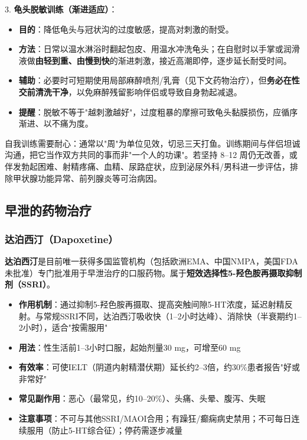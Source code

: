 3. \textbf{龟头脱敏训练（渐进适应）}：
  \begin{itemize}
  \item \textbf{目的}：降低龟头与冠状沟的过度敏感，提高对刺激的耐受。
  \item \textbf{方法}：日常以温水淋浴时翻起包皮、用温水冲洗龟头；在自慰时以手掌或润滑液做\textbf{由轻到重、由慢到快}的渐进刺激，接近高潮即停，逐步延长耐受时间。
  \item \textbf{辅助}：必要时可短期使用局部麻醉喷剂/乳膏（见下文药物治疗），但\textbf{务必在性交前清洗干净}，以免麻醉残留影响伴侣或导致自身勃起减退。
  \item \textbf{提醒}：脱敏不等于"越刺激越好"，过度粗暴的摩擦可致龟头黏膜损伤，应循序渐进、以不痛为度。
  \end{itemize}

\begin{tcolorbox}[colback=pink!5!white,colframe=red!50!black,title=贴心小叮咛]
自我训练需要耐心：通常以"周"为单位见效，切忌三天打鱼。训练期间与伴侣坦诚沟通，把它当作双方共同的事而非"一个人的功课"。若坚持 8--12 周仍无改善，或伴发勃起困难、射精疼痛、血精、尿路症状，应到泌尿外科/男科进一步评估，排除甲状腺功能异常、前列腺炎等可治病因。
\end{tcolorbox}

\subsection{早泄的药物治疗}

\subsubsection{达泊西汀（Dapoxetine）}

\textbf{达泊西汀}是目前唯一获得多国监管机构（包括欧洲EMA、中国NMPA，美国FDA未批准）专门批准用于早泄治疗的口服药物。属于\textbf{短效选择性5-羟色胺再摄取抑制剂（SSRI）}。

\begin{itemize}[leftmargin=2cm]
	\item \textbf{作用机制}：通过抑制5-羟色胺再摄取、提高突触间隙5-HT浓度，延迟射精反射。与常规SSRI不同，达泊西汀吸收快（1--2小时达峰）、消除快（半衰期约1--2小时），适合"按需服用"
	\item \textbf{用法}：性生活前1--3小时口服，起始剂量30 mg，可增至60 mg
	\item \textbf{有效率}：可使IELT（阴道内射精潜伏期）延长约2--3倍，约30\%患者报告"好或非常好"
	\item \textbf{常见副作用}：恶心（最常见，约10--20\%）、头痛、头晕、腹泻、失眠
	\item \textbf{注意事项}：不可与其他SSRI/MAOI合用；有躁狂/癫痫病史禁用；不可每日连续服用（防止5-HT综合征）；停药需逐步减量
\end{itemize}

